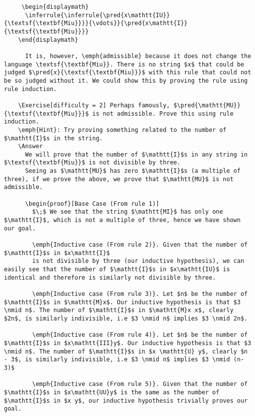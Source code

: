 \documentclass{book}
\begin{document}
\begin{verbatim}
     \begin{displaymath} 
      \inferrule{\inferrule{\pred{x\mathtt{IU}}{\textsf{\textbf{Miu}}}}{\vdots}}{\pred{x\mathtt{I}}{\textsf{\textbf{Miu}}}}
    \end{displaymath}
      
      It is, however, \emph{admissible} because it does not change the language \textsf{\textbf{Miu}}. There is no string $x$ that could be judged $\pred{x}{\textsf{\textbf{Miu}}}$ with this rule that could not be so judged without it. We could show this by proving the rule using rule induction.

    \Exercise[difficulty = 2] Perhaps famously, $\pred{\mathtt{MU}}{\textsf{\textbf{Miu}}}$ is not admissible. Prove this using rule induction.
    \emph{Hint}: Try proving something related to the number of $\mathtt{I}$s in the string.
    \Answer
      We will prove that the number of $\mathtt{I}$s in any string in $\textsf{\textbf{Miu}}$ is not divisible by three.
      Seeing as $\mathtt{MU}$ has zero $\mathtt{I}$s (a multiple of three), if we prove the above, we prove that $\mathtt{MU}$ is not admissible.
      
      \begin{proof}[Base Case (From rule 1)]
        $\;$ We see that the string $\mathtt{MI}$ has only one $\mathtt{I}$, which is not a multiple of three, hence we have shown our goal.
        
        \emph{Inductive case (From rule 2)}. Given that the number of $\mathtt{I}$s in $x\mathtt{I}$
        is not divisible by three (our inductive hypothesis), we can easily see that the number of $\mathtt{I}$s in $x\mathtt{IU}$ is identical and therefore is similarly not divisible by three.
        
        \emph{Inductive case (From rule 3)}. Let $n$ be the number of $\mathtt{I}$s in $\mathtt{M}x$. Our inductive hypothesis is that $3 \nmid n$. The number of $\mathtt{I}$s in $\mathtt{M}x x$, clearly $2n$, is similarly indivisible, i.e $3 \nmid n$ implies $3 \nmid 2n$. 
        
        \emph{Inductive case (From rule 4)}. Let $n$ be the number of $\mathtt{I}$s in $x\mathtt{III}y$. Our inductive hypothesis is that $3 \nmid n$. The number of $\mathtt{I}$s in $x \mathtt{U} y$, clearly $n - 3$, is similarly indivisible, i.e $3 \nmid n$ implies $3 \nmid (n-3)$
        
        \emph{Inductive case (From rule 5)}. Given that the number of $\mathtt{I}$s in $x\mathtt{UU}y$ is the same as the number of $\mathtt{I}$s in $x y$, our inductive hypothesis trivially proves our goal.
        

\end{verbatim}
\end{document}
